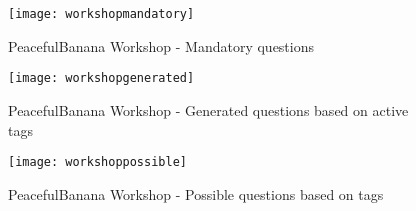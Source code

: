\begin{figure}[H]
    \centering
        \texttt{[image: workshopmandatory]}
    \caption{PeacefulBanana Workshop - Mandatory questions}
    \label{workshopmandatoryfunc}
\end{figure}
\begin{figure}[H]
    \centering
        \texttt{[image: workshopgenerated]}
    \caption{PeacefulBanana Workshop - Generated questions based on active tags}
    \label{workshopgeneratedfunc}
\end{figure}
\begin{figure}[H]
    \centering
        \texttt{[image: workshoppossible]}
    \caption{PeacefulBanana Workshop - Possible questions based on tags}
    \label{workshoppossiblefunc}
\end{figure}

